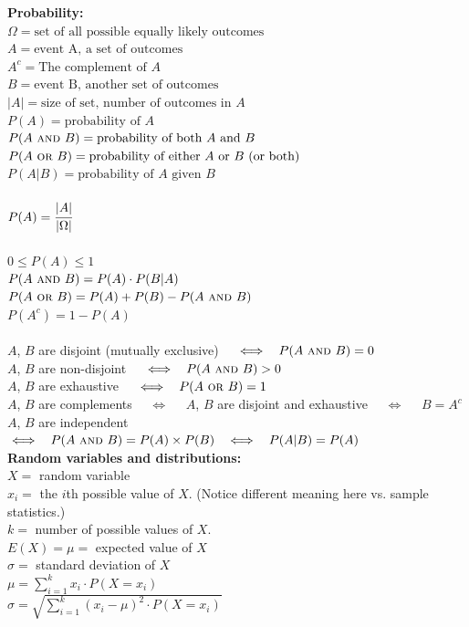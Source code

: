 \documentclass[12pt,letterpaper,addpoints]{exam}
\begin{document}
{\bf Probability:}\\
$\Omega = \text{set of all possible equally likely outcomes}$\\
$A = \text{event A, a set of outcomes}$\\
$A^c = \text{The complement of }A$\\
$B = \text{event B, another set of outcomes}$\\
$|A| = \text{size of set, number of outcomes in } A$\\
$P(A) = \text{probability of }A$\\
$P(A ~\textsc{and}~ B) = \text{probability of both $A$ and $B$}$\\
$P(A ~\textsc{or}~ B) = \text{probability of either $A$ or $B$ (or both)}$\\
$P(A | B) = \text{probability of $A$ given $B$}$\\\\
$P(A) = \cfrac{|A|}{|\Omega|}$\\\\
$0 \le P(A) \le 1$\\
$P(A ~\textsc{and}~ B) = P(A) \cdot P(B|A)$\\
$P(A ~\textsc{or}~ B) = P(A) + P(B) - P(A~\textsc{and}~ B)$\\
$P(A^c) = 1 - P(A)$
\\\\
$A$, $B$ are disjoint (mutually exclusive) ~~$\iff~~P(A~\textsc{and}~ B) = 0$\\
$A$, $B$ are non-disjoint ~~$\iff~~P(A~\textsc{and}~ B) > 0$\\
$A$, $B$ are exhaustive ~~$\iff~~P(A~\textsc{or}~ B) = 1$\\
$A$, $B$ are complements ~~$\iff$~~ $A$, $B$ are disjoint and exhaustive ~~$\iff$~~ $B=A^c$\\
$A$, $B$ are independent ~~$\iff~~P(A~\textsc{and}~ B) = P(A)\times P(B) ~~\iff~~ P(A|B)=P(A)$\\

{\bf Random variables and distributions:}\\
$X=$ random variable \\
$x_i=$ the $i$th possible value of $X$. (Notice different meaning here {vs.} sample statistics.)\\
$k=$ number of possible values of $X$.\\
$E(X)=\mu=$ expected value of $X$\\
$\sigma=$ standard deviation of $X$\\
$\mu = \sum_{i=1}^k  x_i \cdot P(X=x_i) $\\
$\sigma = \sqrt{\sum_{i=1}^k (x_i-\mu)^2 \cdot P(X=x_i)}$
\end{document}
